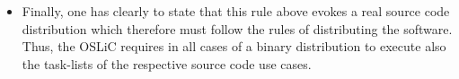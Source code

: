 \begin{itemize}
  \item Finally, one has clearly to state that this rule above evokes a real
  source code distribution which therefore must follow the rules of distributing
  the software. Thus, the OSLiC requires in all cases of a binary distribution
  to execute also the task-lists of the respective source code use cases.
 
\end{itemize}








%
